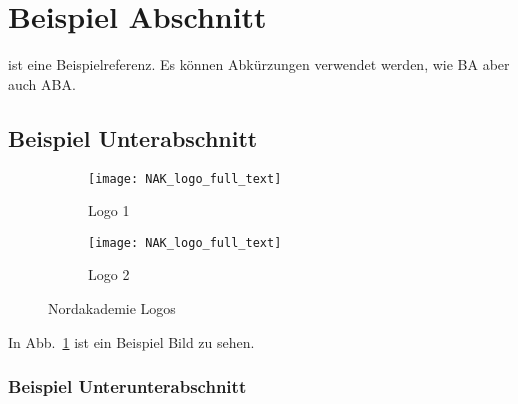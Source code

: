 \section{Beispiel Abschnitt}
\parencite{latex_companion} ist eine Beispielreferenz.
Es können Abkürzungen verwendet werden, wie \ac{BA} aber auch \ac{ABA}.

\subsection{Beispiel Unterabschnitt}

\begin{figure}[h]
    \centering

    \begin{subfigure}{.4\textwidth}
        \centering
        \texttt{[image: NAK\_logo\_full\_text]}
        \caption{Logo 1}
        \label{fig:subfig1}
    \end{subfigure}
    \begin{subfigure}{.4\textwidth}
        \centering
        \texttt{[image: NAK\_logo\_full\_text]}
        \caption{Logo 2}
        \label{fig:subfig2}
    \end{subfigure}

    \caption{Nordakademie Logos}
    \label{fig:fig}
\end{figure}

In Abb.~\ref{fig:subfig1} ist ein Beispiel Bild zu sehen.

\subsubsection{Beispiel Unterunterabschnitt}

\Blindtext{}
